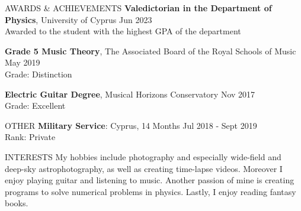 \documentclass{resume} %
\begin{document}
\begin{rSection}{AWARDS \& ACHIEVEMENTS}
{\bf Valedictorian in the Department of Physics}, University of Cyprus \hfill Jun 2023\\
Awarded to the student with the highest GPA of the department

{\bf Grade 5 Music Theory}, The Associated Board of the Royal Schools of Music \hfill May 2019\\
Grade: Distinction

{\bf Electric Guitar Degree}, Musical Horizons Conservatory \hfill Nov 2017\\
Grade: Excellent
\end{rSection} 

\bigbreak

\begin{rSection}{OTHER}
{\bf Military Service}: Cyprus, 14 Months \hfill {Jul 2018 - Sept 2019}\\
Rank: Private
\end{rSection}

\bigbreak

\begin{rSection}{INTERESTS} 
My hobbies include photography and especially wide-field and deep-sky astrophotography, as well as creating time-lapse videos.
Moreover I enjoy playing guitar and listening to music.
Another passion of mine is creating programs to solve numerical problems in physics.
Lastly, I enjoy reading fantasy books.
\end{rSection}
\end{document}
